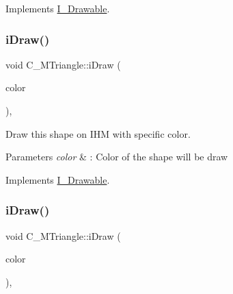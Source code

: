Implements \hyperlink{classI__Drawable_ae24c65000977a805f52ce032321cd86f}{I\+\_\+\+Drawable}.

\mbox{\label{classC__MTriangle_a049e6026145865387db4244678336784}} 
\subsubsection{\texorpdfstring{i\+Draw()}{iDraw()}\hspace{0.1cm}{\footnotesize\ttfamily [3/4]}}
{\footnotesize\ttfamily void C\+\_\+\+M\+Triangle\+::i\+Draw (\begin{DoxyParamCaption}\item[{M\+L\+V\+\_\+\+Color}]{color }\end{DoxyParamCaption})\hspace{0.3cm}{\ttfamily [override]}, {\ttfamily [virtual]}}



Draw this shape on I\+HM with specific color. 


\begin{DoxyParams}{Parameters}
{\em color} & \+: Color of the shape will be draw \\
\hline
\end{DoxyParams}


Implements \hyperlink{classI__Drawable_a25f6474325614c451a91f019e5fe8010}{I\+\_\+\+Drawable}.

\mbox{\label{classC__MTriangle_a049e6026145865387db4244678336784}} 
\subsubsection{\texorpdfstring{i\+Draw()}{iDraw()}\hspace{0.1cm}{\footnotesize\ttfamily [4/4]}}
{\footnotesize\ttfamily void C\+\_\+\+M\+Triangle\+::i\+Draw (\begin{DoxyParamCaption}\item[{M\+L\+V\+\_\+\+Color}]{color }\end{DoxyParamCaption})\hspace{0.3cm}{\ttfamily [override]}, {\ttfamily [virtual]}}



